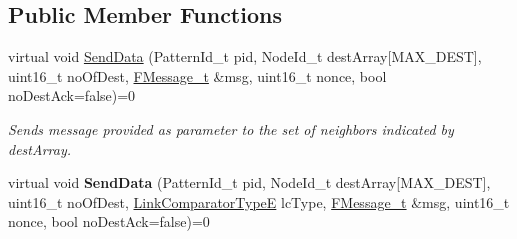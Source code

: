 \subsection*{Public Member Functions}
\begin{DoxyCompactItemize}
\item 
virtual void \hyperlink{class_p_w_i_1_1_framework___i_abe350ffa7efc7fe687215e980e6d1d3c}{Send\+Data} (Pattern\+Id\+\_\+t pid, Node\+Id\+\_\+t dest\+Array\mbox{[}M\+A\+X\+\_\+\+D\+E\+ST\mbox{]}, uint16\+\_\+t no\+Of\+Dest, \hyperlink{class_core_1_1_message_t}{F\+Message\+\_\+t} \&msg, uint16\+\_\+t nonce, bool no\+Dest\+Ack=false)=0
\begin{DoxyCompactList}\small\item\em Sends message provided as parameter to the set of neighbors indicated by dest\+Array. \end{DoxyCompactList}\item 
virtual void {\bfseries Send\+Data} (Pattern\+Id\+\_\+t pid, Node\+Id\+\_\+t dest\+Array\mbox{[}M\+A\+X\+\_\+\+D\+E\+ST\mbox{]}, uint16\+\_\+t no\+Of\+Dest, \hyperlink{namespace_p_w_i_1_1_neighborhood_a54f3d64f52739fa54193660451fd8a6f}{Link\+Comparator\+TypeE} lc\+Type, \hyperlink{class_core_1_1_message_t}{F\+Message\+\_\+t} \&msg, uint16\+\_\+t nonce, bool no\+Dest\+Ack=false)=0\hypertarget{class_p_w_i_1_1_framework___i_a7a8abb88dfb4d4ddbfb908c244fa4f61}{}\label{class_p_w_i_1_1_framework___i_a7a8abb88dfb4d4ddbfb908c244fa4f61}


\end{DoxyCompactItemize}
